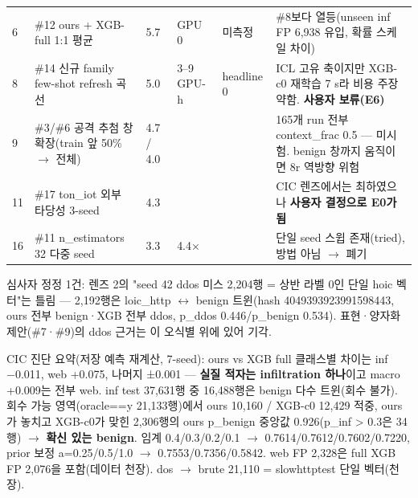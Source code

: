 \begin{longtable}
{}6 & \#12 ours +\allowbreak{} XGB-full 1:1 평균 & 5.7 & GPU 0 & 미측정 & \#8보다 열등(unseen inf FP 6,938 유입, 확률 스케일 차이) \\
{}8 & \#14 신규 family few-shot refresh 곡선 & 5.0 & 3–9 GPU-h & headline 0 & ICL 고유 축이지만 XGB-c0 재학습 7 s라 비용 주장 약함. \textbf{사용자 보류(E6)} \\
{}9 & \#3/\allowbreak{}\#6 공격 추첨 창 확장(train 앞 50\%  \ensuremath{\rightarrow}  전체) & 4.7 /\allowbreak{} 4.0 &  &  & 165개 run 전부 context\_\allowbreak{}frac 0.5 — 미시험. benign 창까지 움직이면 8r 역방향 위험 \\
{}11 & \#17 ton\_\allowbreak{}iot 외부 타당성 3-seed & 4.3 &  &  & CIC 렌즈에서는 최하였으나 \textbf{사용자 결정으로 E0가 됨} \\
{}16 & \#11 n\_\allowbreak{}estimators 32 다중 seed & 3.3 & 4.4× &  & 단일 seed 스윕 존재(tried), 방법 아님  \ensuremath{\rightarrow}  폐기 \\
\bottomrule
\end{longtable}
\endgroup
심사자 정정 1건: 렌즈 2의 "seed 42 ddos 미스 2,204행 =\allowbreak{} 상반 라벨 0인 단일 hoic 벡터"는 틀림 — 2,192행은 loic\_\allowbreak{}http \ensuremath{\leftrightarrow} benign 트윈(hash 4049393923991598443, ours 전부 benign·XGB 전부 ddos, p\_\allowbreak{}ddos 0.446/\allowbreak{}p\_\allowbreak{}benign 0.534). 표현·양자화 제안(\#7·\#9)의 ddos 근거는 이 오식별 위에 있어 기각.

CIC 진단 요약(저장 예측 재계산, 7-seed): ours vs XGB full 클래스별 차이는 inf −0.011, web +\allowbreak{}0.075, 나머지 ±0.001 — \textbf{실질 적자는 infiltration 하나}이고 macro +\allowbreak{}0.009는 전부 web. inf test 37,631행 중 16,488행은 benign 다수 트윈(회수 불가). 회수 가능 영역(oracle=\allowbreak{}=\allowbreak{}y 21,133행)에서 ours 10,160 /\allowbreak{} XGB-c0 12,429 적중, ours가 놓치고 XGB-c0가 맞힌 2,306행의 ours p\_\allowbreak{}benign 중앙값 0.926(p\_\allowbreak{}inf > 0.3은 34행)  \ensuremath{\rightarrow}  \textbf{확신 있는 benign}. 임계 0.4/\allowbreak{}0.3/\allowbreak{}0.2/\allowbreak{}0.1  \ensuremath{\rightarrow}  0.7614/\allowbreak{}0.7612/\allowbreak{}0.7602/\allowbreak{}0.7220, prior 보정 a=\allowbreak{}0.25/\allowbreak{}0.5/\allowbreak{}1.0  \ensuremath{\rightarrow}  0.7553/\allowbreak{}0.7356/\allowbreak{}0.5842. web FP 2,328은 full XGB FP 2,076을 포함(데이터 천장). dos \ensuremath{\rightarrow} brute 21,110 =\allowbreak{} slowhttptest 단일 벡터(천장).

